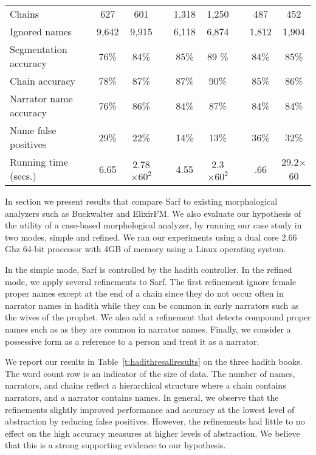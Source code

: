 \documentclass[11pt]{article}
\begin{document}
\begin{table*}[bt]
\begin{tabular}{lp{.2cm}ccp{.2cm}ccp{.2cm}cc}
Chains & & 627 & 601 &  & 1,318 & 1,250 & & 487 & 452 \\ 
Ignored names & & 9,642 & 9,915 &  & 6,118 & 6,874 & & 1,812 & 1,904 \\ \hline
Segmentation accuracy & & 76\%& 84\%& & 85\%& 89 \%& & 84\%& 85\%\\ 
Chain accuracy & & 78\% & 87\%&  & 87\%& 90\%& & 85\% & 86\% \\ 
Narrator name accuracy & & 76\% & 86\%& & 84\%& 87\% & & 84\% & 84\% \\ \hline
Name false positives & & 29\% & 22\%&  & 14\%& 13\% & & 36\% & 32\% \\ \hline
Running time (secs.)& & 6.65 & 2.78$\times60^2$& &4.55 & 2.3$\times60^2$ & & .66 & 29.2$\times$60 
\end{tabular}
\normalsize
\label{t:hadithresallresults}
\end{table*}

In section we present results that compare Sarf to existing 
morphological analyzers such as Buckwalter and ElixirFM. 
We also evaluate our hypothesis of the utility of a case-based 
morphological analyzer,
by running our case study in two modes, simple and refined.
We ran our experiments using a dual core 2.66 Ghz 64-bit processor 
with 4GB of memory using a Linux operating system. 

In the simple mode, Sarf is controlled by the hadith controller.
In the refined mode, we apply several refinements to Sarf.
The first refinement ignore female proper names except at the end of
a chain since they do not occur often in narrator names in hadith while
they can be common in early narrators such as the wives of the prophet.
We also add a refinement that detects compound proper names 
such as  
as they are common in narrator names.
Finally, we consider a possessive form as a reference to a person and treat
it as a narrator.

We report our results in Table~\ref{t:hadithresallresults} on the three hadith books.
The word count row is an indicator of the size of data.
The number of names, narrators, and chains reflect a hierarchical structure where a chain contains
narrators, and a narrator contains names.
In general, we observe that the refinements slightly improved performance and accuracy at
the lowest level of abstraction by reducing false positives.
However, the refinements had little to no effect on the high accuracy measures at higher
levels of abstraction.
We believe that this is a strong supporting evidence to our hypothesis.
\end{document}
